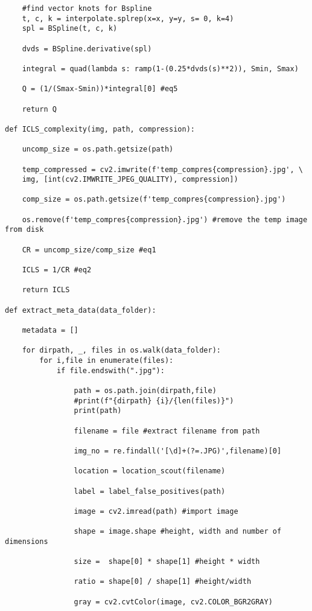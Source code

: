 \documentclass[12pt]{article}
\begin{document}
\begin{verbatim}
    #find vector knots for Bspline
    t, c, k = interpolate.splrep(x=x, y=y, s= 0, k=4)
    spl = BSpline(t, c, k)
    
    dvds = BSpline.derivative(spl)

    integral = quad(lambda s: ramp(1-(0.25*dvds(s)**2)), Smin, Smax)

    Q = (1/(Smax-Smin))*integral[0] #eq5   

    return Q

def ICLS_complexity(img, path, compression):

    uncomp_size = os.path.getsize(path)

	temp_compressed = cv2.imwrite(f'temp_compres{compression}.jpg', \
	img, [int(cv2.IMWRITE_JPEG_QUALITY), compression])

    comp_size = os.path.getsize(f'temp_compres{compression}.jpg')

    os.remove(f'temp_compres{compression}.jpg') #remove the temp image from disk

    CR = uncomp_size/comp_size #eq1

    ICLS = 1/CR #eq2

    return ICLS

def extract_meta_data(data_folder):

    metadata = []

    for dirpath, _, files in os.walk(data_folder):
        for i,file in enumerate(files): 
            if file.endswith(".jpg"):

                path = os.path.join(dirpath,file)
                #print(f"{dirpath} {i}/{len(files)}")
                print(path)

                filename = file #extract filename from path

                img_no = re.findall('[\d]+(?=.JPG)',filename)[0] 

                location = location_scout(filename)

                label = label_false_positives(path)
                
                image = cv2.imread(path) #import image

                shape = image.shape #height, width and number of dimensions

                size =  shape[0] * shape[1] #height * width

                ratio = shape[0] / shape[1] #height/width

                gray = cv2.cvtColor(image, cv2.COLOR_BGR2GRAY)


\end{verbatim}
\end{document}

